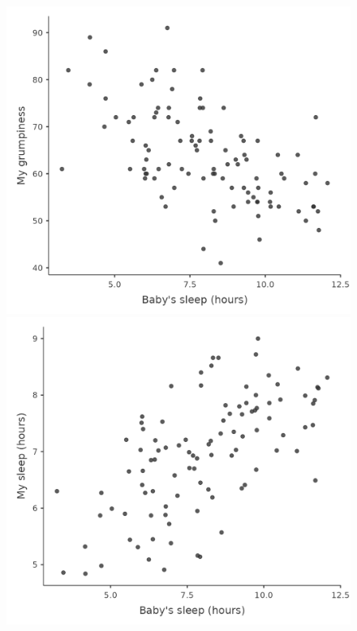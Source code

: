 \documentclass[
  a4paper,
]{book}
\begin{document}
\begin{figure}

\begin{minipage}[b]{0.50\linewidth}

{\centering 

\includegraphics{images/fig12-2a.png}

}

\subcaption{\label{fig-fig12-3a}}
\end{minipage}%
%
\begin{minipage}[b]{0.50\linewidth}

{\centering 

\includegraphics{images/fig12-3b.png}

}
\end{minipage}
\end{figure}
\end{document}
